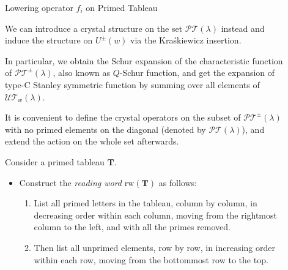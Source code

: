 \documentclass[final]{beamer}
\theoremstyle{definition}
\numberwithin{equation}{section}
\newlength{\sepwid}
\newlength{\onecolwid}
\newlength{\twocolwid}
\begin{document}
\begin{frame}[t]
\begin{columns}[t]
\begin{column}{\twocolwid}
\begin{columns}[t]
\begin{column}{\onecolwid}
\end{column} %

\end{columns}

\end{column}

\begin{column}{\sepwid}\end{column} %

\begin{column}{\onecolwid}\vspace{-.6in} %


\begin{block}{Lowering operator $f_i$ on Primed Tableau}

We can introduce a crystal structure on the set $\mathcal{PT} (\lambda)$ instead and induce the structure on $U^{\pm}(w)$ via the Kra\'skiewicz insertion. 

In particular, we obtain the Schur expansion of the characteristic function of $\mathcal{PT}^\pm (\lambda)$, also known as $Q$-Schur function, and get the expansion of type-C Stanley symmetric function by summing over all elements of $\mathcal{UT}_w (\lambda)$.

It is convenient to define the crystal operators on the subset of $\mathcal{PT}^\pm (\lambda)$ with no primed elements on the diagonal (denoted by $\mathcal{PT} (\lambda)$), and extend the action on the whole set afterwards. 

Consider a primed tableau $\mathbf{T}$.

\begin{itemize}
\item Construct the \textit{reading word}  $\mathrm{rw}(\mathbf{T})$ as follows:

	\begin{enumerate}
	\item List all primed letters in the tableau, column by column, in decreasing order within each column, moving from the rightmost column to the left, and with all the primes removed.
	\item Then list all unprimed elements, row by row, in increasing order within each row, moving from the bottommost row to the top.
	\end{enumerate}


\end{itemize}
\end{block}
\end{column}
\end{columns}
\end{frame}
\end{document}
